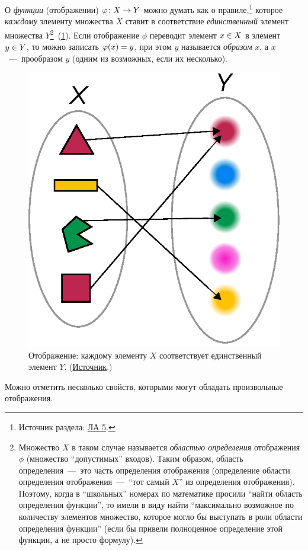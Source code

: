 \documentclass[a4paper,12pt]{article}
\begin{document}
  О \emph{функции} (отображении) $\phi\colon X \hm\to Y$ можно думать как о правиле,\footnote{
    Источник раздела: \href{https://github.com/Alvant/GeomeSeminare/tree/master2022/seminars/linalge/seminar05}{ЛА 5}.
  } которое \emph{каждому} элементу множества $X$ ставит в соответствие \emph{единственный} элемент множества $Y$\footnote{Множество $X$ в таком случае называется \emph{областью определения} отображения $\phi$ (множество ``допустимых'' входов). Таким образом, область определения~---~это часть определения отображения (определение области определения отображения~---~``тот самый $X$'' из определения отображения). Поэтому, когда в ``школьных'' номерах по математике просили ``найти область определения функции'', то имели в виду найти ``максимально возможное по количеству элементов множество, которое могло бы выступать в роли области определения функции'' (если бы привели полноценное определение этой функции, а не просто формулу).}~(\ref{fig:function}).
  Если отображение $\phi$ переводит элемент $x \hm\in X$ в элемент $y \hm\in Y$, то можно записать $\phi(x) \hm= y$, при этом $y$ называется \emph{образом} $x$, а $x$~---~прообразом $y$ (одним из возможных, если их несколько).
  
  \begin{figure}[ht]
    \centering
  
    \includegraphics[width=0.3\columnwidth]{function}
  
    \caption{
      Отображение: каждому элементу $X$ соответствует единственный элемент $Y$.
      ({\small \href{https://en.wikipedia.org/wiki/Function\_(mathematics)\#/media/File:Function_color_example_3.svg}{Источник}.})
    }
    \label{fig:function}
  \end{figure}
  
  
  Можно отметить несколько свойств, которыми могут обладать произвольные отображения.
  
\end{document}
